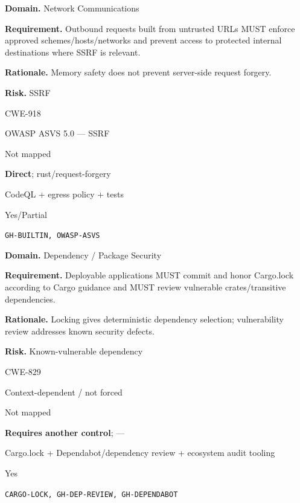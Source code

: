 \documentclass[10pt,letterpaper]{article}
\newcommand{\prioritybadge}[2]{\tcbox[on line,boxrule=0pt,arc=1.2mm,boxsep=0.7mm,left=1mm,right=1mm,top=0.4mm,bottom=0.4mm,colback=#2!12,coltext=#2]{\scriptsize\bfseries #1}}
\begin{document}
\begin{rulebox}[title={\texttt{SCS-RUST-NET-001} \hfill \prioritybadge{Critical Control}{Critical}}]
\textbf{Domain.} Network Communications

\textbf{Requirement.} Outbound requests built from untrusted URLs MUST enforce approved schemes/hosts/networks and prevent access to protected internal destinations where SSRF is relevant.

\textbf{Rationale.} Memory safety does not prevent server-side request forgery.

\textbf{Risk.} SSRF

\begin{description}[leftmargin=2.65cm,labelwidth=2.3cm,style=nextline,itemsep=1pt,topsep=3pt]
  \item[CWE] CWE-918
  \item[OWASP] OWASP ASVS 5.0 --- SSRF
  \item[CERT] Not mapped
  \item[CodeQL] \textbf{Direct}; rust/request-forgery
  \item[Enforcement] CodeQL + egress policy + tests
  \item[Automation] Yes/Partial
  \item[Sources] \texttt{GH-BUILTIN, OWASP-ASVS}
\end{description}
\end{rulebox}

\begin{rulebox}[title={\texttt{SCS-RUST-DEP-001} \hfill \prioritybadge{High Priority}{High}}]
\textbf{Domain.} Dependency / Package Security

\textbf{Requirement.} Deployable applications MUST commit and honor Cargo.lock according to Cargo guidance and MUST review vulnerable crates/transitive dependencies.

\textbf{Rationale.} Locking gives deterministic dependency selection; vulnerability review addresses known security defects.

\textbf{Risk.} Known-vulnerable dependency

\begin{description}[leftmargin=2.65cm,labelwidth=2.3cm,style=nextline,itemsep=1pt,topsep=3pt]
  \item[CWE] CWE-829
  \item[OWASP] Context-dependent / not forced
  \item[CERT] Not mapped
  \item[CodeQL] \textbf{Requires another control}; ---
  \item[Enforcement] Cargo.lock + Dependabot/dependency review + ecosystem audit tooling
  \item[Automation] Yes
  \item[Sources] \texttt{CARGO-LOCK, GH-DEP-REVIEW, GH-DEPENDABOT}
\end{description}
\end{rulebox}
\end{document}
